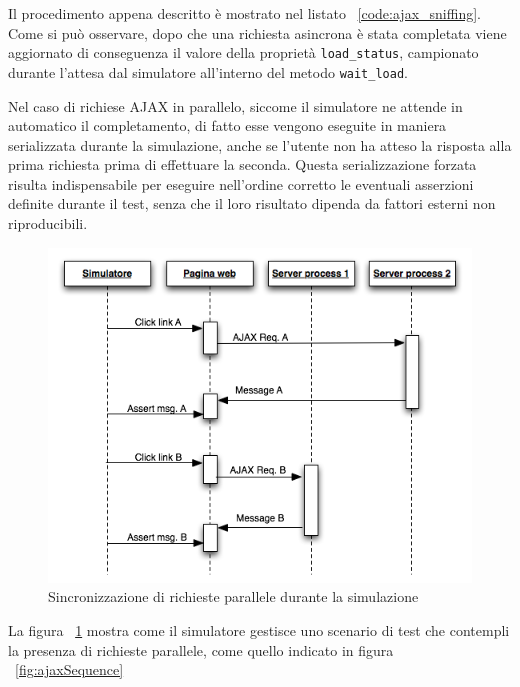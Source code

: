 \vspace{1cm}


Il procedimento appena descritto è mostrato nel listato ~\ref{code:ajax_sniffing}. Come si può osservare, dopo che una richiesta asincrona è stata completata viene aggiornato di conseguenza il valore della proprietà \verb|load_status|, campionato durante l'attesa dal simulatore all'interno del metodo \verb|wait_load|.

Nel caso di richiese AJAX in parallelo, siccome il simulatore ne attende in automatico il completamento, di fatto esse vengono eseguite in maniera serializzata durante la simulazione, anche se l'utente non ha atteso la risposta alla prima richiesta prima di effettuare la seconda. Questa serializzazione forzata risulta indispensabile per eseguire nell'ordine corretto le eventuali asserzioni definite durante il test, senza che il loro risultato dipenda da fattori esterni non riproducibili.

\begin{figure}[htbp]
\begin{center}
\includegraphics[width=\textwidth]{images/ajax_sync_for_simulation.png}
\caption{Sincronizzazione di richieste parallele durante la simulazione}
\label{fig:ajaxParallelSimulation}
\end{center}
\end{figure}

La figura ~\ref{fig:ajaxParallelSimulation} mostra come il simulatore gestisce uno scenario di test che contempli la presenza di richieste parallele, come quello indicato in figura ~\ref{fig:ajaxSequence}


